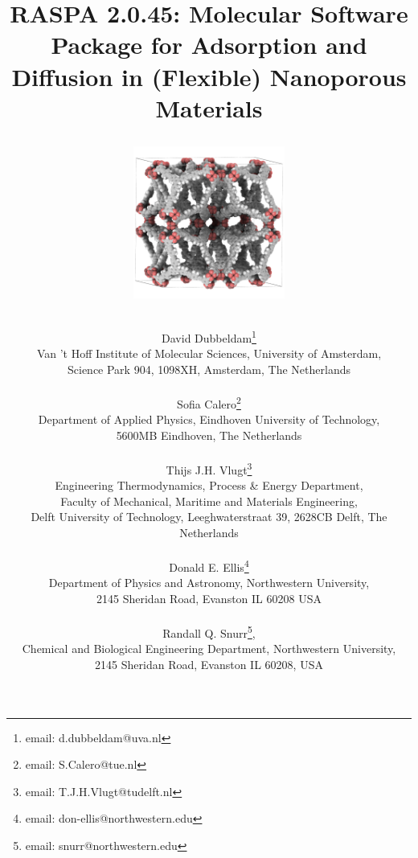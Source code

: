 \documentclass[onecolumn]{book}
\begin{document}
\title{
\vskip -3.0cm
RASPA 2.0.45: Molecular Software Package for Adsorption and Diffusion in (Flexible) Nanoporous Materials
\vskip 0.25cm
\begin{figure}[H]
\centering
\includegraphics[width=5cm]{NU-110.jpg}
\end{figure}}
\author{
David Dubbeldam\footnote{email: d.dubbeldam@uva.nl}\\
Van 't Hoff Institute of Molecular Sciences, University of Amsterdam,\\
Science Park 904, 1098XH, Amsterdam, The Netherlands\\\\
Sofia Calero\footnote{email: S.Calero@tue.nl}\\
Department of Applied Physics,
Eindhoven University of Technology,\\
5600MB Eindhoven, The Netherlands\\\\
Thijs J.H. Vlugt\footnote{email: T.J.H.Vlugt@tudelft.nl}\\
Engineering Thermodynamics, Process \& Energy Department,\\
Faculty of Mechanical, Maritime and Materials Engineering,\\
Delft University of Technology, Leeghwaterstraat 39, 2628CB Delft, The Netherlands\\\\
Donald E. Ellis\footnote{email: don-ellis@northwestern.edu}\\
Department of Physics and Astronomy, Northwestern University,\\
2145 Sheridan Road, Evanston IL  60208  USA\\\\
Randall Q. Snurr\footnote{email: snurr@northwestern.edu},\\
Chemical and Biological Engineering Department, Northwestern University,\\
2145 Sheridan Road, Evanston IL  60208,  USA
}
\maketitle
\end{document}
